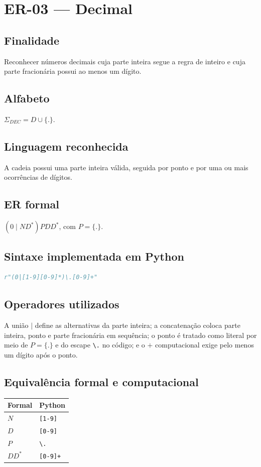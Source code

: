 \section{ER-03 --- Decimal}
\subsection{Finalidade}
Reconhecer números decimais cuja parte inteira segue a regra de inteiro e cuja parte fracionária possui ao menos um dígito.
\subsection{Alfabeto}
$\Sigma_{DEC}=D\cup\{.\}$.
\subsection{Linguagem reconhecida}
A cadeia possui uma parte inteira válida, seguida por ponto e por uma ou mais ocorrências de dígitos.
\subsection{ER formal}
$(0\mid ND^*)PDD^*$, com $P=\{.\}$.
\subsection{Sintaxe implementada em Python}
\begin{lstlisting}[language=Python]
r"(0|[1-9][0-9]*)\.[0-9]+"
\end{lstlisting}
\subsection{Operadores utilizados}
A união $\mid$ define as alternativas da parte inteira; a concatenação coloca parte inteira, ponto e parte fracionária em sequência; o ponto é tratado como literal por meio de $P=\{.\}$ e do escape \texttt{\textbackslash.} no código; e o $+$ computacional exige pelo menos um dígito após o ponto.
\subsection{Equivalência formal e computacional}
\begin{center}
\small
\begin{tabular}{|p{}|p{}|}
\toprule
Formal & Python \\
\midrule
$N$ & \texttt{[1-9]} \\
$D$ & \texttt{[0-9]} \\
$P$ & \texttt{\textbackslash.} \\
$DD^*$ & \texttt{[0-9]+} \\
\bottomrule
\end{tabular}
\end{center}
